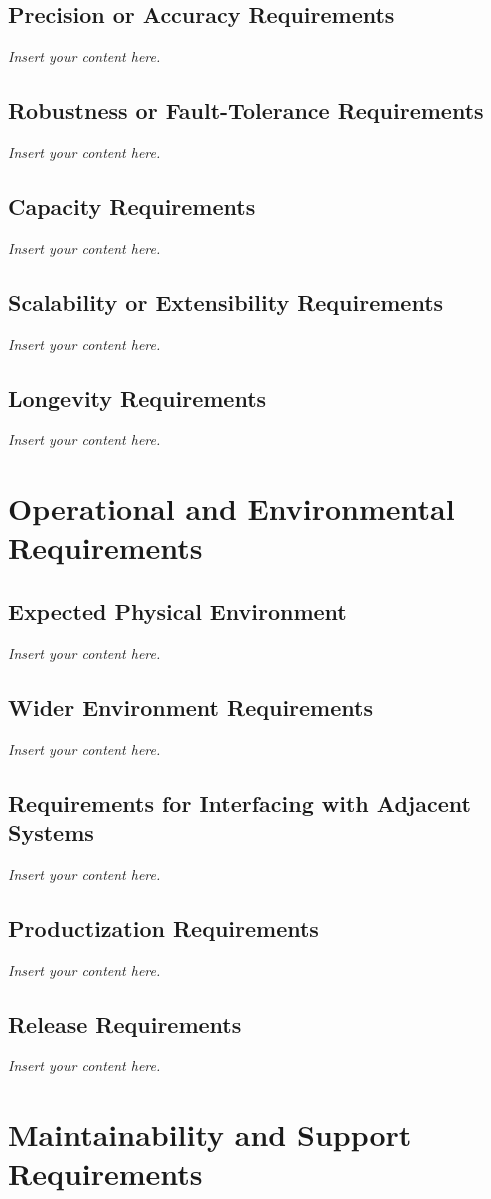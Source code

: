 \documentclass[12pt]{article}
\newcommand{\lips}{\textit{Insert your content here.}}
\begin{document}
\subsection{Precision or Accuracy Requirements}
\lips
\subsection{Robustness or Fault-Tolerance Requirements}
\lips
\subsection{Capacity Requirements}
\lips
\subsection{Scalability or Extensibility Requirements}
\lips
\subsection{Longevity Requirements}
\lips

\section{Operational and Environmental Requirements}
\subsection{Expected Physical Environment}
\lips
\subsection{Wider Environment Requirements}
\lips
\subsection{Requirements for Interfacing with Adjacent Systems}
\lips
\subsection{Productization Requirements}
\lips
\subsection{Release Requirements}
\lips

\section{Maintainability and Support Requirements}
\end{document}
